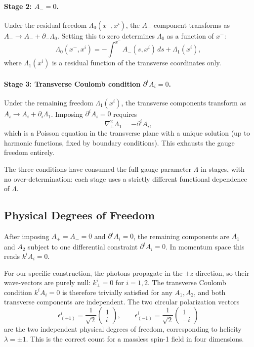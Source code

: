 \paragraph{Stage 2: $A_- = 0$.}
Under the residual freedom $\Lambda_0(x^-, x^i)$, the $A_-$ component transforms as
$A_- \to A_- + \partial_-\Lambda_0$. Setting this to zero determines $\Lambda_0$ as a 
function of $x^-$:
\begin{equation}
    \Lambda_0(x^-, x^i) = -\int^{x^-} A_-(s, x^i)\,ds + \Lambda_1(x^i),
\end{equation}
where $\Lambda_1(x^i)$ is a residual function of the transverse coordinates only.

\paragraph{Stage 3: Transverse Coulomb condition $\partial^i A_i = 0$.}
Under the remaining freedom $\Lambda_1(x^i)$, the transverse components transform as 
$A_i \to A_i + \partial_i\Lambda_1$. Imposing $\partial^i A_i = 0$ requires
\begin{equation}
    \nabla^2_\perp\Lambda_1 = -\partial^i A_i,
\end{equation}
which is a Poisson equation in the transverse plane with a unique solution (up to 
harmonic functions, fixed by boundary conditions). This exhausts the gauge freedom 
entirely.

The three conditions have consumed the full gauge parameter $\Lambda$ in stages, 
with no over-determination: each stage uses a strictly different functional 
dependence of $\Lambda$.

\subsection{Physical Degrees of Freedom}

After imposing $A_+ = A_- = 0$ and $\partial^i A_i = 0$, the remaining components 
are $A_1$ and $A_2$ subject to one differential constraint $\partial^i A_i = 0$. 
In momentum space this reads $k^i A_i = 0$.

For our specific construction, the photons propagate in the $\pm z$ direction, 
so their wave-vectors are purely null: $k^i_\perp = 0$ for $i = 1,2$. The 
transverse Coulomb condition $k^i A_i = 0$ is therefore trivially satisfied for 
any $A_1, A_2$, and both transverse components are independent. The two circular 
polarization vectors
\begin{equation}
    \epsilon^i_{(+1)} = \frac{1}{\sqrt{2}}\begin{pmatrix}1\\i\end{pmatrix}, \qquad
    \epsilon^i_{(-1)} = \frac{1}{\sqrt{2}}\begin{pmatrix}1\\-i\end{pmatrix}
\end{equation}
are the two independent physical degrees of freedom, corresponding to helicity 
$\lambda = \pm 1$. This is the correct count for a massless spin-1 field in four 
dimensions.

